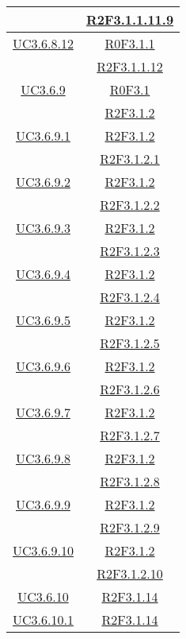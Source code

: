 \begin{longtable}{|c|c|}
& \hyperlink{R2F3.1.1.11.9}{R2F3.1.1.11.9}\\
\hline
\hyperlink{UC3.6.8.12}{UC3.6.8.12} & \hyperlink{R0F3.1.1}{R0F3.1.1}\\
& \hyperlink{R2F3.1.1.12}{R2F3.1.1.12}\\
\hline
\hyperlink{UC3.6.9}{UC3.6.9} & \hyperlink{R0F3.1}{R0F3.1}\\
& \hyperlink{R2F3.1.2}{R2F3.1.2}\\
\hline
\hyperlink{UC3.6.9.1}{UC3.6.9.1} & \hyperlink{R2F3.1.2}{R2F3.1.2}\\
& \hyperlink{R2F3.1.2.1}{R2F3.1.2.1}\\
\hline
\hyperlink{UC3.6.9.2}{UC3.6.9.2} & \hyperlink{R2F3.1.2}{R2F3.1.2}\\
& \hyperlink{R2F3.1.2.2}{R2F3.1.2.2}\\
\hline
\hyperlink{UC3.6.9.3}{UC3.6.9.3} & \hyperlink{R2F3.1.2}{R2F3.1.2}\\
& \hyperlink{R2F3.1.2.3}{R2F3.1.2.3}\\
\hline
\hyperlink{UC3.6.9.4}{UC3.6.9.4} & \hyperlink{R2F3.1.2}{R2F3.1.2}\\
& \hyperlink{R2F3.1.2.4}{R2F3.1.2.4}\\
\hline
\hyperlink{UC3.6.9.5}{UC3.6.9.5} & \hyperlink{R2F3.1.2}{R2F3.1.2}\\
& \hyperlink{R2F3.1.2.5}{R2F3.1.2.5}\\
\hline
\hyperlink{UC3.6.9.6}{UC3.6.9.6} & \hyperlink{R2F3.1.2}{R2F3.1.2}\\
& \hyperlink{R2F3.1.2.6}{R2F3.1.2.6}\\
\hline
\hyperlink{UC3.6.9.7}{UC3.6.9.7} & \hyperlink{R2F3.1.2}{R2F3.1.2}\\
& \hyperlink{R2F3.1.2.7}{R2F3.1.2.7}\\
\hline
\hyperlink{UC3.6.9.8}{UC3.6.9.8} & \hyperlink{R2F3.1.2}{R2F3.1.2}\\
& \hyperlink{R2F3.1.2.8}{R2F3.1.2.8}\\
\hline
\hyperlink{UC3.6.9.9}{UC3.6.9.9} & \hyperlink{R2F3.1.2}{R2F3.1.2}\\
& \hyperlink{R2F3.1.2.9}{R2F3.1.2.9}\\
\hline
\hyperlink{UC3.6.9.10}{UC3.6.9.10} & \hyperlink{R2F3.1.2}{R2F3.1.2}\\
& \hyperlink{R2F3.1.2.10}{R2F3.1.2.10}\\
\hline
\hyperlink{UC3.6.10}{UC3.6.10} & \hyperlink{R2F3.1.14}{R2F3.1.14}\\
\hline
\hyperlink{UC3.6.10.1}{UC3.6.10.1} & \hyperlink{R2F3.1.14}{R2F3.1.14}\\

\end{longtable}
